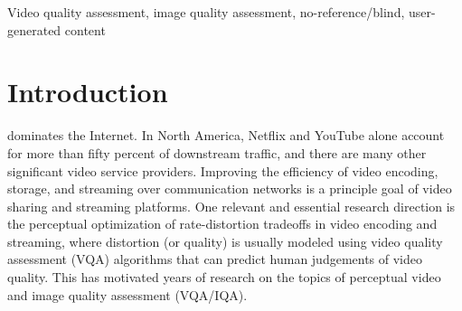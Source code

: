 \documentclass[journal]{IEEEtran}
\begin{document}
\begin{IEEEkeywords}
Video quality assessment, image quality assessment, no-reference/blind, user-generated content
\end{IEEEkeywords}

\IEEEpeerreviewmaketitle



\section{Introduction}
 dominates the Internet. In North America, Netflix and YouTube alone account for more than fifty percent of downstream traffic, and there are many other significant video service providers. Improving the efficiency of video encoding, storage, and streaming over communication networks is a principle goal of video sharing and streaming platforms. One relevant and essential research direction is the perceptual optimization of rate-distortion tradeoffs in video encoding and streaming, where distortion (or quality) is usually modeled using video quality assessment (VQA) algorithms that can predict human judgements of video quality. This has motivated years of research on the topics of perceptual video and image quality assessment (VQA/IQA).
\end{document}
